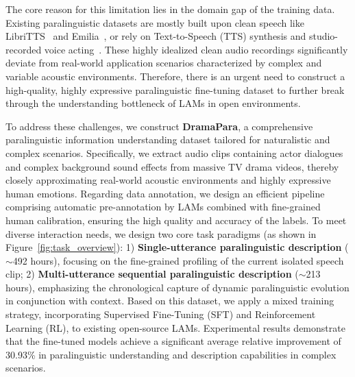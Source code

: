 \documentclass{Interspeech}
\begin{document}
The core reason for this limitation lies in the domain gap of the training data. Existing paralinguistic datasets are mostly built upon clean speech like LibriTTS~\cite{zen19_interspeech} and Emilia~\cite{Emilia}, or rely on Text-to-Speech (TTS) synthesis and studio-recorded voice acting~\cite{guo2023prompttts, busso2025msp, busso2008iemocap, lu24c_interspeech, SynParaSpeech, Zh_Paral, nagraniy2017voxceleb, nguyen23_interspeech, richter24_interspeech, TextrolSpeech, MM_TTS, SpeechCraft, kawamura24_interspeech, COCO_NUT, diwan-etal-2025-scaling, borisov25_ssw, NVSpeech}. These highly idealized clean audio recordings significantly deviate from real-world application scenarios characterized by complex and variable acoustic environments. Therefore, there is an urgent need to construct a high-quality, highly expressive paralinguistic fine-tuning dataset to further break through the understanding bottleneck of LAMs in open environments.

To address these challenges, we construct \textbf{DramaPara}, a comprehensive paralinguistic information understanding dataset tailored for naturalistic and complex scenarios. Specifically, we extract audio clips containing actor dialogues and complex background sound effects from massive TV drama videos, thereby closely approximating real-world acoustic environments and highly expressive human emotions. Regarding data annotation, we design an efficient pipeline comprising automatic pre-annotation by LAMs combined with fine-grained human calibration, ensuring the high quality and accuracy of the labels. To meet diverse interaction needs, we design two core task paradigms (as shown in Figure~\ref{fig:task_overview}): 1) \textbf{Single-utterance paralinguistic description} ($\sim$492 hours), focusing on the fine-grained profiling of the current isolated speech clip; 2) \textbf{Multi-utterance sequential paralinguistic description} ($\sim$213 hours), emphasizing the chronological capture of dynamic paralinguistic evolution in conjunction with context. Based on this dataset, we apply a mixed training strategy, incorporating Supervised Fine-Tuning (SFT) and Reinforcement Learning (RL), to existing open-source LAMs. Experimental results demonstrate that the fine-tuned models achieve a significant average relative improvement of 30.93\% in paralinguistic understanding and description capabilities in complex scenarios.
\end{document}
